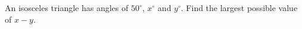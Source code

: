 An isosceles triangle has angles of $50^\circ$, $x^\circ$ and $y^\circ$. Find the largest possible value of $x-y$.
